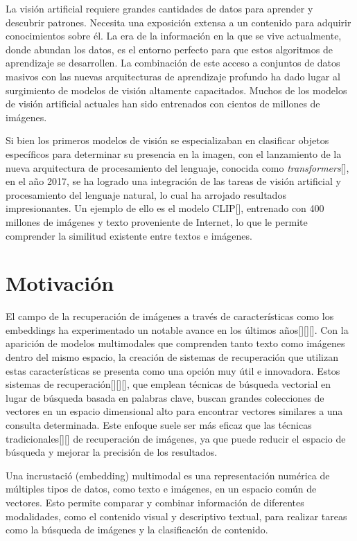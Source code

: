 La visi\'on artificial requiere grandes cantidades de datos para aprender y descubrir patrones. Necesita una exposici\'on extensa a un contenido para adquirir conocimientos sobre \'el. La era de la informaci\'on en la que se vive actualmente, donde abundan los datos, es el entorno perfecto para que estos algoritmos de aprendizaje se desarrollen. La combinaci\'on de este acceso a conjuntos de datos masivos con las nuevas arquitecturas de aprendizaje profundo ha dado lugar al surgimiento de modelos de visi\'on altamente capacitados. Muchos de los modelos de visi\'on artificial actuales han sido entrenados con cientos de millones de im\'agenes.

Si bien los primeros modelos de visi\'on se especializaban en clasificar objetos espec\'ificos para determinar su presencia en la imagen, con el lanzamiento de la nueva arquitectura de procesamiento del lenguaje, conocida como \textit{transformers}[\cite{transformers}], en el a\~no 2017, se ha logrado una integraci\'on de las tareas de visi\'on artificial y procesamiento del lenguaje natural, lo cual ha arrojado resultados impresionantes. Un ejemplo de ello es el modelo CLIP[\cite{clip-paper}], entrenado con 400 millones de im\'agenes y texto proveniente de Internet, lo que le permite comprender la similitud existente entre textos e im\'agenes.

\section*{Motivaci\'on}
El campo de la recuperación de imágenes a través de características como los embeddings ha experimentado un notable avance en los últimos años[\cite{embedding1}][\cite{embedding2}][\cite{Baldrati2022}]. Con la aparición de modelos multimodales que comprenden tanto texto como imágenes dentro del mismo espacio, la creación de sistemas de recuperación que utilizan estas características se presenta como una opción muy útil e innovadora. Estos sistemas de recuperación[\cite{keita2023clip}][\cite{Baldrati2022}][\cite{embedding2}], que emplean técnicas de búsqueda vectorial en lugar de búsqueda basada en palabras clave, buscan grandes colecciones de vectores en un espacio dimensional alto para encontrar vectores similares a una consulta determinada. Este enfoque suele ser más eficaz que las técnicas tradicionales[\cite{Perez2023-Etiquetado}][\cite{RoblesSanchez2004}] de recuperación de imágenes, ya que puede reducir el espacio de búsqueda y mejorar la precisión de los resultados.

Una incrustaci\'o (embedding) multimodal es una representación numérica de múltiples tipos de datos, como texto e imágenes, en un espacio común de vectores. Esto permite comparar y combinar información de diferentes modalidades, como el contenido visual y descriptivo textual, para realizar tareas como la búsqueda de imágenes y la clasificación de contenido.

